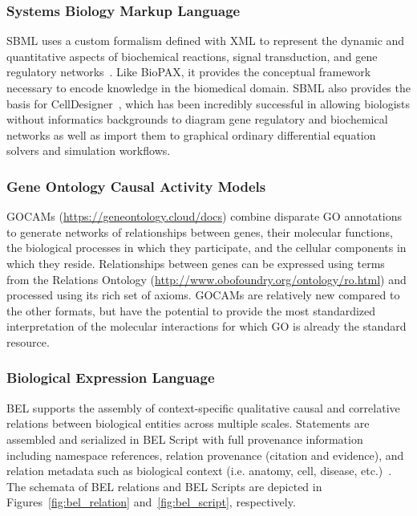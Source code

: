 \subsubsection{Systems Biology Markup Language}

\ac{SBML} uses a custom formalism defined with \ac{XML} to represent the dynamic and quantitative aspects of biochemical reactions, signal transduction, and gene regulatory networks~\cite{Hucka2003}.
Like \ac{BioPAX}, it provides the conceptual framework necessary to encode knowledge in the biomedical domain.
\ac{SBML} also provides the basis for CellDesigner~\cite{Funahashi2003}, which has been incredibly successful in allowing biologists without informatics backgrounds to diagram gene regulatory and biochemical networks as well as import them to graphical ordinary differential equation solvers and simulation workflows.

\subsubsection{Gene Ontology Causal Activity Models}

\acp{GOCAM} (\url{https://geneontology.cloud/docs}) combine disparate \ac{GO} annotations to generate networks of relationships between genes, their molecular functions, the biological processes in which they participate, and the cellular components in which they reside.
Relationships between genes can be expressed using terms from the Relations Ontology (\url{http://www.obofoundry.org/ontology/ro.html}) and processed using its rich set of axioms.
\acp{GOCAM} are relatively new compared to the other formats, but have the potential to provide the most standardized interpretation of the molecular interactions for which \ac{GO} is already the standard resource.

\subsubsection{Biological Expression Language}

\ac{BEL} supports the assembly of context-specific qualitative causal and correlative relations between biological entities across multiple scales.
Statements are assembled and serialized in \ac{BEL} Script with full provenance information including namespace references, relation provenance (citation and evidence), and relation metadata such as biological context (i.e. anatomy, cell, disease, etc.)~\cite{Slater2014}.
The schemata of BEL relations and BEL Scripts are depicted in Figures~\ref{fig:bel_relation} and~\ref{fig:bel_script}, respectively.

